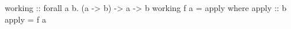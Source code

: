 \begin{code}
working :: forall a b. (a -> b) -> a -> b
working f a = apply
  where
    apply :: b
    apply = f a
\end{code}

